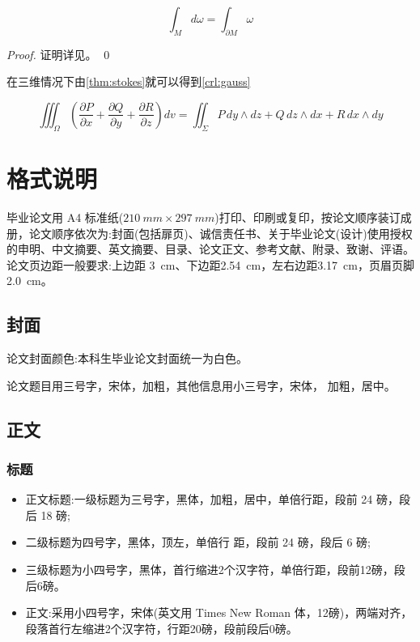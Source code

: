 \documentclass[oneside]{LZU}
\begin{document}
\begin{theorem}[斯托克斯公式]
    \begin{equation}
        \int_M d\omega = \int_{\partial M} \omega
    \end{equation}
    \label{thm:stokes}
\end{theorem}
\begin{proof}
    证明详见\supercite{stokes}。
    \qed
\end{proof}
在三维情况下由\cref{thm:stokes}就可以得到\cref{crl:gauss}
\begin{corollary}[高斯公式]
    \[\iiint_{\Omega}\left(\frac{\partial P}{\partial x}+\frac{\partial Q}{\partial y}+\frac{\partial R}{\partial z}\right)dv=\iint_{\Sigma}P\,dy\wedge dz+Q\,dz\wedge dx+R\,dx\wedge dy\]
    \label{crl:gauss}
\end{corollary}



\chapter{格式说明}
\label{chp:format}
毕业论文用 A4 标准纸($\SI{210}{mm}\times \SI{297}{mm}$)打印、印刷或复印，按论文顺序装订成册，论文顺序依次为:封面(包括扉页)、诚信责任书、关于毕业论文(设计)使用授权的申明、中文摘要、英文摘要、目录、论文正文、参考文献、附录、致谢、评语。论文页边距一般要求:上边距 \SI{3}{cm}、下边距\SI{2.54}{cm}，左右边距\SI{3.17}{cm}，页眉页脚\SI{2.0}{cm}。
\section{封面}
论文封面颜色:本科生毕业论文封面统一为白色。

论文题目用三号字，宋体，加粗，其他信息用小三号字，宋体， 加粗，居中。
\section{正文}
\subsection{标题}
\begin{itemize}
    \item 正文标题:一级标题为三号字，黑体，加粗，居中，单倍行距，段前 24 磅，段后 18 磅;
    \item 二级标题为四号字，黑体，顶左，单倍行 距，段前 24 磅，段后 6 磅;
    \item 三级标题为小四号字，黑体，首行缩进2个汉字符，单倍行距，段前12磅，段后6磅。
    \item 正文:采用小四号字，宋体(英文用 Times New Roman 体，12磅)，两端对齐，段落首行左缩进2个汉字符，行距20磅，段前段后0磅。
\end{itemize}
\end{document}
